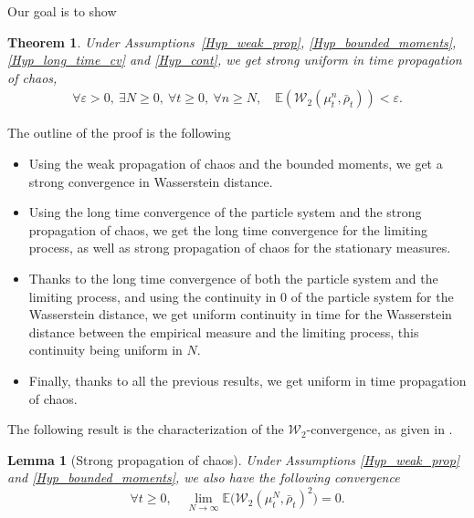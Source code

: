 \documentclass[10pt]{amsart}
\let\epsilon\varepsilon
\theoremstyle{plain}
\newtheorem{theorem}{Theorem}
\newtheorem{lemma}{Lemma}[section]
\theoremstyle{definition}
\begin{document}
Our goal is to show
\begin{theorem}\label{unif_prop_chaos_a_partir_de_tout_un_tas_de_proprietes_que_je_ne_vais_pas_donner_parce_que_la_reference_devient_trop_longue_mais_vous_voyez_l_idee}
Under Assumptions~\ref{Hyp_weak_prop}, \ref{Hyp_bounded_moments}, \ref{Hyp_long_time_cv} and \ref{Hyp_cont}, we get strong uniform in time propagation of chaos, \ie
\begin{align*}
\forall \epsilon>0,\ \exists N\geq0,\ \forall t\geq0,\ \forall n\geq N,\quad \mathbb{E}\left(\mathcal{W}_2\left(\mu^n_t,\bar{\rho}_t\right)\right)<\epsilon.
\end{align*}
\end{theorem}

The outline of the proof is the following
\begin{itemize}
\item Using the weak propagation of chaos and the bounded moments, we get a strong convergence in Wasserstein distance.
\item Using the long time convergence of the particle system and the strong propagation of chaos, we get the long time convergence for the limiting process, as well as strong propagation of chaos for the stationary measures.
\item Thanks to the long time convergence of both the particle system and the limiting process, and using the continuity in $0$ of the particle system for the Wasserstein distance, we get uniform continuity in time for the Wasserstein distance between the empirical measure and the limiting process, this continuity being uniform in $N$.
\item Finally, thanks to all the previous results, we get uniform in time propagation of chaos.
\end{itemize}

The following result is the characterization of the $\mathcal{W}_2$-convergence, as given in \cite[Th.\,6.9]{villani2008optimal}.

\begin{lemma}[Strong propagation of chaos]\label{strong_prop}
Under Assumptions \ref{Hyp_weak_prop} and \ref{Hyp_bounded_moments}, we also have the following convergence
\begin{equation}
\forall t\geq0,\quad \lim_{N\to\infty}\mathbb{E}\bigl(\mathcal{W}_2\left(\mu^N_t,\bar{\rho}_t\right)^2\bigr)=0.
\end{equation}
\end{lemma}
\end{document}
